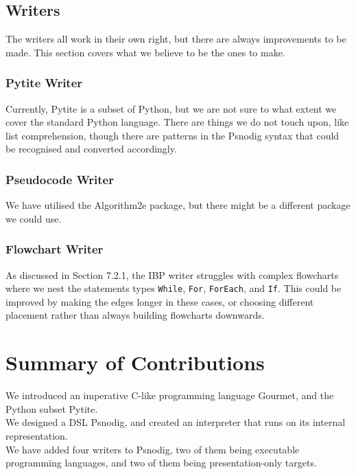 \subsection{Writers}

The writers all work in their own right, but there are always improvements to be made. This section covers what we believe to be the ones to make.

\subsubsection{Pytite Writer}

Currently, Pytite is a subset of Python, but we are not sure to what extent we cover the standard Python language. There are things we do not touch upon, like list comprehension, though there are patterns in the Psnodig syntax that could be recognised and converted accordingly.

\subsubsection{Pseudocode Writer}

We have utilised the Algorithm2e package, but there might be a different package we could use.

\subsubsection{Flowchart Writer}

As discussed in Section 7.2.1, the IBP writer struggles with complex flowcharts where we nest the statements types \texttt{While}, \texttt{For}, \texttt{ForEach}, and \texttt{If}. This could be improved by making the edges longer in these cases, or choosing different placement rather than always building flowcharts downwards.

\section{Summary of Contributions}

We introduced an imperative C-like programming language Gourmet, and the Python subset Pytite. \\

We designed a DSL Psnodig, and created an interpreter that runs on its internal representation. \\

We have added four writers to Psnodig, two of them being executable programming languages, and two of them being presentation-only targets.